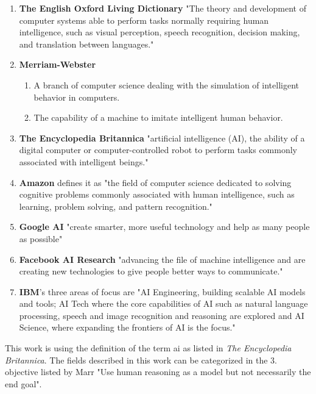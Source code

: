 \documentclass[10pt,a4paper]{article}
\begin{document}
\begin{enumerate}
\item \textbf{The English Oxford Living Dictionary} "The theory and development of computer systems able to perform tasks normally requiring human intelligence, such as visual perception, speech recognition, decision making, and translation between languages."
\item \textbf{Merriam-Webster}
\begin{enumerate}
\item A branch of computer science dealing with the simulation of intelligent behavior in computers.
\item The capability of a machine to imitate intelligent human behavior.
\end{enumerate}
\item \textbf{The Encyclopedia Britannica} "artificial intelligence (AI), the ability of a digital computer or computer-controlled robot to perform tasks commonly associated with intelligent beings."
\item \textbf{Amazon} defines it as "the field of computer science dedicated to solving cognitive problems commonly associated with human intelligence, such as learning, problem solving, and pattern recognition."
\item \textbf{Google AI} "create smarter, more useful technology and help as many people as possible"
\item \textbf{Facebook AI Research} "advancing the file of machine intelligence and are creating new technologies to give people better ways to communicate."
\item \textbf{IBM}'s three areas of focus are "AI Engineering, building scalable AI models and tools; AI Tech where the core capabilities of AI such as natural language processing, speech and image recognition and reasoning are explored and AI Science, where expanding the frontiers of AI is the focus."\cite{Marr2018}
\end{enumerate}
This work is using the definition of the term \gls{ai} as listed in \textit{The Encyclopedia Britannica}. The fields described in this work can be categorized in the 3. objective listed by Marr "Use human reasoning as a model but not necessarily the end goal"\cite{Marr2018}.
\end{document}
